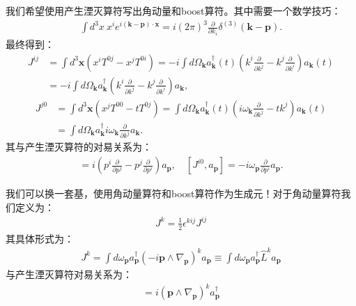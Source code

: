 我们希望使用产生湮灭算符写出角动量和boost算符。其中需要一个数学技巧：
\begin{align}
  \int d^3x
  \ x^ie^{i(\mathbf{k-p})\cdot\mathbf{x}}=i(2\pi)^3\frac{\partial}{\partial
  k_i}\delta^{(3)}(\mathbf{k-p}).
\end{align}
最终得到：
\begin{align}
  J^{ij}&=\int d^3\mathbf{x}(x^iT^{0j}-x^jT^{0i})=-i\int
  d\Omega_\mathbf{k}a_\mathbf{k}^\dagger(t)\left(k^i\frac{\partial}{\partial
  k^j}-k^j\frac{\partial}{\partial k^i}\right)a_\mathbf{k}(t)\\
  &=-i\int
  d\Omega_\mathbf{k}a_\mathbf{k}^\dagger\left(k^i\frac{\partial}{\partial
  k^j}-k^j\frac{\partial}{\partial k^i}\right)a_\mathbf{k},
\end{align}
\begin{align}
  J^{j0}&=\int d^3\mathbf{x}\left(x^jT^{00}-tT^{0j}\right)=\int
  d\Omega_{\mathbf{k}}a_{\mathbf{k}}^{\dagger}(t)\left(i\omega_{\mathbf{k}}\frac{\partial}{\partial
  k^{j}}-tk^{j}\right)a_{\mathbf{k}}(t)\\
  &=\int d\Omega_\mathbf{k}a_\mathbf{k}^\dagger
  i\omega_\mathbf{k}\frac{\partial}{\partial k^j}a_\mathbf{k}.
\end{align}
其与产生湮灭算符的对易关系为：
\begin{align}
  [J^{ij},a_{\mathbf{p}}]= i\left(p^i\frac{\partial}{\partial
  p^j}-p^j\frac{\partial}{\partial p^i}\right)a_{\mathbf{p}},\quad
  [J^{i0},a_{\mathbf{p}}]=-i\omega_{\mathbf{p}}\frac{\partial}{\partial
  p^i}a_{\mathbf{p}}.
\end{align}

\bigskip
{}

我们可以换一套基，使用角动量算符和boost算符作为生成元！对于角动量算符我们定义为：
\begin{align}
  J^k=\frac{1}{2}\epsilon^{kij}J^{ij}
\end{align}
其具体形式为：
\begin{align}
  J^k=\int
  d\omega_\mathbf{p}a_\mathbf{p}^\dagger(-i\mathbf{p}\wedge\nabla_\mathbf{p})^ka_\mathbf{p}\equiv\int
  d\omega_\mathbf{p}a_\mathbf{p}^\dagger\hat{L}^ka_\mathbf{p}
\end{align}
与产生湮灭算符对易关系为：
\begin{align}
  [J^k,a_{\mathbf{p}}^\dagger]=i(\mathbf{p}\wedge\nabla_{\mathbf{p}})^ka_{\mathbf{p}}^\dagger
\end{align}

